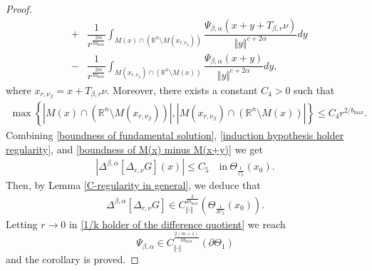 \documentclass[10pt, leqno]{article}
\theoremstyle{definition}
\theoremstyle{remark}
\numberwithin{equation}{section}
\begin{document}
\begin{proof}
\begin{eqnarray}
& + & \dfrac{1}{r^{\frac{2m}{kb_{\max}}}}\int_{M(x) \cap (\mathbb{R}^{n} \setminus M(x^{}_{r, \nu_{\beta}}))}  \dfrac{\Psi_{\beta, \alpha}(x + y + T_{\beta, r}\nu)}{\Vert y \Vert^{c + 2\alpha}} dy \\ \nonumber
& - & \dfrac{1}{r^{\frac{2m}{kb_{\max}}}} \int_{M(x^{}_{r, \nu_{\beta}})\cap (\mathbb{R}^{n} \setminus M(x))} \dfrac{\Psi_{\beta, \alpha}(x + y)}{\Vert y \Vert^{c + 2\alpha}} dy,
\end{eqnarray}
where $x^{}_{r, \nu_{\beta}} = x + T_{\beta, r}\nu$. Moreover, there exists a constant $C_{4} >0$ such that
\begin{eqnarray}
\label{boundness of M(x) minus M(x+y)}
\max \left\lbrace \left | M(x) \cap (\mathbb{R}^{n} \setminus M(x^{}_{r, \nu_{\beta}}))\right |, \left | M(x^{}_{r, \nu_{\beta}})\cap (\mathbb{R}^{n} \setminus M(x))\right | \right\rbrace \leq C_{4}r^{2/b_{\max}}.
\end{eqnarray}
Combining \eqref{boundness of fundamental solution}, \eqref{induction hypothesis holder regularity}, and \eqref{boundness of M(x) minus M(x+y)} we get
\begin{eqnarray}
\label{boundness of the difference quotient}
\left | \Delta^{\beta, \alpha}\left[\Delta_{r,\nu}G \right](x) \right| \leq C_{5} \quad \text{in} \ \Theta_{\frac{1}{C_{2}}}(x_{0}).
\end{eqnarray}
Then, by Lemma \ref{C-regularity in general}, we deduce that
\begin{eqnarray}
\label{1/k holder of the difference quotient}
\Delta^{\beta, \alpha}\left[\Delta_{r,\nu}G \right] \in   C^{\frac{2}{kb_{\max}}}_{\Vert \cdot \Vert}\left(\Theta_{\frac{1}{2C_{2}}}(x_{0}) \right).
\end{eqnarray}
Letting $r \rightarrow 0$ in \eqref{1/k holder of the difference quotient} we reach
$$
\Psi_{\beta, \alpha} \in C^{\frac{2(m+1)}{kb_{\max}}}_{\Vert \cdot \Vert}\left( \partial \Theta_{1} \right)
$$
and the corollary is proved.
\end{proof}
\end{document}
